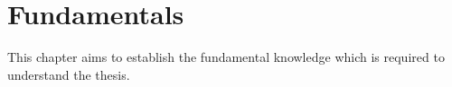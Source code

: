 \chapter{Fundamentals}
\label{chp:fundamentals}

This chapter aims to establish the fundamental knowledge which is required to understand the thesis.




